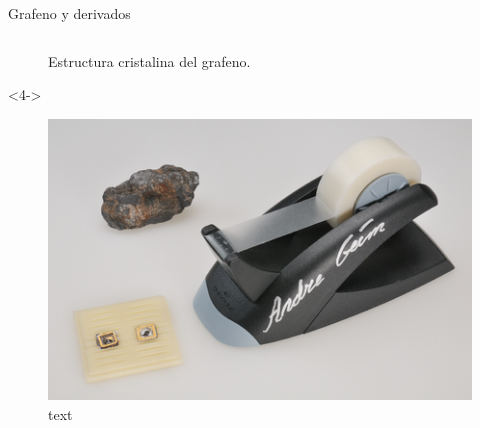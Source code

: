 \documentclass[aspectratio=169]{beamer}
\begin{document}
\begin{frame}{Grafeno y derivados}
\begin{columns}
\begin{column}{0.4\textwidth}
\begin{onlyenv}
\begin{figure}
						\caption{Estructura cristalina del grafeno.}
					\end{figure}
				\end{onlyenv}
				\begin{onlyenv}<4->
					\begin{figure}
						\includegraphics[width=\textwidth]{Nobel_graphene.png}
						\caption{text}
					\end{figure}
				\end{onlyenv}
			\end{column}
		\end{columns}
	\end{frame}
\end{document}
